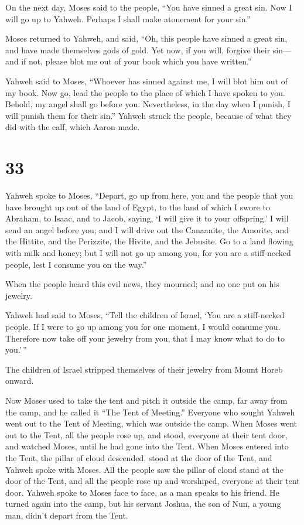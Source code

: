  On the next day, Moses said to the people, ``You have
sinned a great sin. Now I will go up to Yahweh. Perhaps I shall make
atonement for your sin.''

 Moses returned to Yahweh, and said, ``Oh, this people have
sinned a great sin, and have made themselves gods of gold. 
Yet now, if you will, forgive their sin---and if not, please blot me out
of your book which you have written.''

 Yahweh said to Moses, ``Whoever has sinned against me, I
will blot him out of my book.  Now go, lead the people to
the place of which I have spoken to you. Behold, my angel shall go
before you. Nevertheless, in the day when I punish, I will punish them
for their sin.''  Yahweh struck the people, because of what
they did with the calf, which Aaron made.

\hypertarget{section-32}{%
\section{33}\label{section-32}}

 Yahweh spoke to Moses, ``Depart, go up from here, you and
the people that you have brought up out of the land of Egypt, to the
land of which I swore to Abraham, to Isaac, and to Jacob, saying, `I
will give it to your offspring.'  I will send an angel
before you; and I will drive out the Canaanite, the Amorite, and the
Hittite, and the Perizzite, the Hivite, and the Jebusite. 
Go to a land flowing with milk and honey; but I will not go up among
you, for you are a stiff-necked people, lest I consume you on the way.''

 When the people heard this evil news, they mourned; and no
one put on his jewelry.

 Yahweh had said to Moses, ``Tell the children of Israel,
`You are a stiff-necked people. If I were to go up among you for one
moment, I would consume you. Therefore now take off your jewelry from
you, that I may know what to do to you.'\,''

 The children of Israel stripped themselves of their jewelry
from Mount Horeb onward.

 Now Moses used to take the tent and pitch it outside the
camp, far away from the camp, and he called it ``The Tent of Meeting.''
Everyone who sought Yahweh went out to the Tent of Meeting, which was
outside the camp.  When Moses went out to the Tent, all the
people rose up, and stood, everyone at their tent door, and watched
Moses, until he had gone into the Tent.  When Moses entered
into the Tent, the pillar of cloud descended, stood at the door of the
Tent, and Yahweh spoke with Moses.  All the people saw the
pillar of cloud stand at the door of the Tent, and all the people rose
up and worshiped, everyone at their tent door.  Yahweh
spoke to Moses face to face, as a man speaks to his friend. He turned
again into the camp, but his servant Joshua, the son of Nun, a young
man, didn't depart from the Tent.


